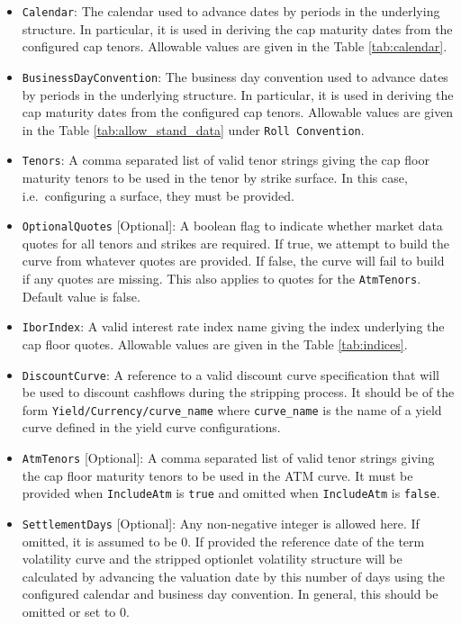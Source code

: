 \begin{itemize}
\item \lstinline!Calendar!:
The calendar used to advance dates by periods in the underlying structure. In particular, it is used in deriving the cap maturity dates from the configured cap tenors. Allowable values are given in the Table \ref{tab:calendar}.

\item \lstinline!BusinessDayConvention!:
The business day convention used to advance dates by periods in the underlying structure. In particular, it is used in deriving the cap maturity dates from the configured cap tenors. Allowable values are given in the Table \ref{tab:allow_stand_data} under \lstinline!Roll Convention!.

\item \lstinline!Tenors!:
A comma separated list of valid tenor strings giving the cap floor maturity tenors to be used in the tenor by strike surface. In this case, i.e.\ configuring a surface, they must be provided.

\item \lstinline!OptionalQuotes! [Optional]:
A boolean flag to indicate whether market data quotes for all tenors and strikes are required. If true, we attempt to build the curve from whatever quotes are provided. If false, the curve will fail to build if any quotes are missing. This also applies to quotes for the \lstinline!AtmTenors!. Default value is false.

\item \lstinline!IborIndex!:
A valid interest rate index name giving the index underlying the cap floor quotes. Allowable values are given in the Table \ref{tab:indices}.

\item \lstinline!DiscountCurve!:
A reference to a valid discount curve specification that will be used to discount cashflows during the stripping process. It should be of the form \lstinline!Yield/Currency/curve_name! where \lstinline!curve_name! is the name of a yield curve defined in the yield curve configurations.

\item \lstinline!AtmTenors! [Optional]:
A comma separated list of valid tenor strings giving the cap floor maturity tenors to be used in the ATM curve. It must be provided when \lstinline!IncludeAtm! is \lstinline!true! and omitted when \lstinline!IncludeAtm! is \lstinline!false!.

\item \lstinline!SettlementDays! [Optional]:
Any non-negative integer is allowed here. If omitted, it is assumed to be 0. If provided the reference date of the term volatility curve and the stripped optionlet volatility structure will be calculated by advancing the valuation date by this number of days using the configured calendar and business day convention. In general, this should be omitted or set to 0.


\end{itemize}
